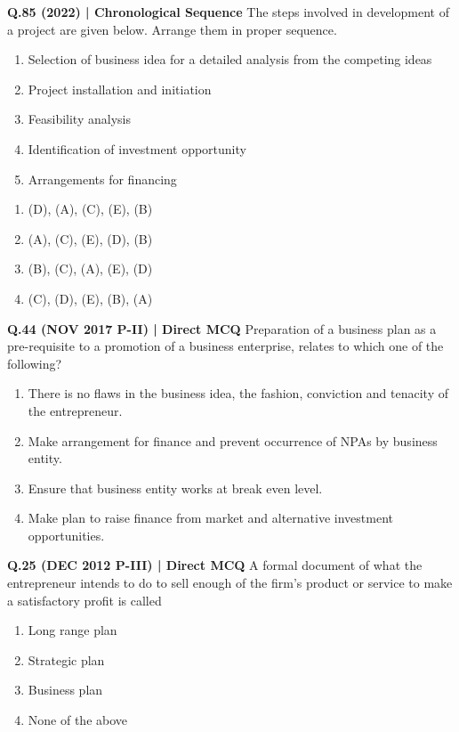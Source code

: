 \documentclass{article}
\begin{document}
\textbf{Q.85 (2022) | Chronological Sequence}
The steps involved in development of a project are given below. Arrange them in proper sequence.
\begin{enumerate}[label=\Alph*.]
    \item Selection of business idea for a detailed analysis from the competing ideas
    \item Project installation and initiation
    \item Feasibility analysis
    \item Identification of investment opportunity
    \item Arrangements for financing
\end{enumerate}
\begin{enumerate}[label=(\arabic*)]
    \item (D), (A), (C), (E), (B)
    \item (A), (C), (E), (D), (B)
    \item (B), (C), (A), (E), (D)
    \item (C), (D), (E), (B), (A)
\end{enumerate}

\textbf{Q.44 (NOV 2017 P-II) | Direct MCQ}
Preparation of a business plan as a pre-requisite to a promotion of a business enterprise, relates to which one of the following?
\begin{enumerate}[label=(\arabic*)]
    \item There is no flaws in the business idea, the fashion, conviction and tenacity of the entrepreneur.
    \item Make arrangement for finance and prevent occurrence of NPAs by business entity.
    \item Ensure that business entity works at break even level.
    \item Make plan to raise finance from market and alternative investment opportunities.
\end{enumerate}

\textbf{Q.25 (DEC 2012 P-III) | Direct MCQ}
A formal document of what the entrepreneur intends to do to sell enough of the firm’s product or service to make a satisfactory profit is called
\begin{enumerate}[label=(\arabic*)]
    \item Long range plan
    \item Strategic plan
    \item Business plan
    \item None of the above
\end{enumerate}
\end{document}
